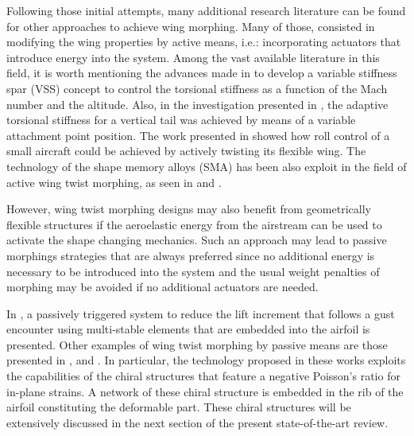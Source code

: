   Following those initial attempts, many additional research literature can be found for other approaches to achieve wing morphing. Many of those, consisted in modifying the wing properties by active means, i.e.: incorporating actuators that introduce energy into the system. Among the vast available literature in this field, it is worth mentioning the advances made in \cite{Chen2000} to develop a variable stiffness spar (VSS) concept to control the torsional stiffness as a function of the Mach number and the altitude. Also, in the investigation presented in \cite{Amprikidis2005}, the adaptive torsional stiffness for a vertical tail was achieved by means of a variable attachment point position. The work presented in \cite{Stanford2007} showed how roll control of a small aircraft could be achieved by actively twisting its flexible wing. The technology of the shape memory alloys (SMA) has been also exploit in the field of active wing twist morphing, as seen in \cite{Sanders2001} and \cite{Elzey2003}.

  However, wing twist morphing designs may also benefit from geometrically flexible structures if the aeroelastic energy from the airstream can be used to activate the shape changing mechanics. Such an approach may lead to passive morphings strategies that are always preferred since no additional energy is necessary to be introduced into the system and the usual weight penalties of morphing may be avoided if no additional actuators are needed. 

  In \cite{Arrieta2014}, a passively triggered system to reduce the lift increment that follows a gust encounter using multi-stable elements that are embedded into the airfoil is presented. Other examples of wing twist morphing by passive means are those presented in \cite{Bornengo2005}, \cite{Spadoni2007a} and \cite{Spadoni2007b}. In particular, the technology proposed in these works exploits the capabilities of the chiral structures that feature a negative Poisson's ratio for in-plane strains. A network of these chiral structure is embedded in the rib of the airfoil constituting the deformable part. These chiral structures will be extensively discussed in the next section of the present state-of-the-art review.

